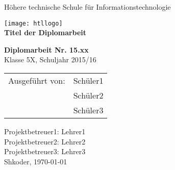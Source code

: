 
\newcommand{\trtitle}{Titel der Diplomarbeit}
\newcommand{\trort}{Shkoder}
\newcommand{\trbetreuer}{Titel Betreuer}
\newcommand{\trdate}{\today}
\newcommand{\trnumber}{15.xx}
\newcommand{\trclass}{5X}
\newcommand{\trschuelereins}{Sch\"uler1}
\newcommand{\trschuelerzwei}{Sch\"uler2}
\newcommand{\trschuelerdrei}{Sch\"uler3}
\newcommand{\trsauftraggeber}{Herr Max Mustermann oder Firma}
\newcommand{\trbetreuereins}{Lehrer1}
\newcommand{\trbetreuerzwei}{Lehrer2}
\newcommand{\trbetreuerdrei}{Lehrer3}

\thispagestyle{empty}

\begin{center}
  \Large H\"ohere technische Schule f\"ur Informationstechnologie
\end{center}

\begin{center}
  \texttt{[image: htllogo]} \\
  \textbf{\LARGE \trtitle}
\end{center}
\vspace{1cm}

\begin{flushleft}
\textbf{\LARGE Diplomarbeit Nr. \trnumber} \\
\LARGE Klasse \trclass{}, Schuljahr 2015/16

\begin{table}[htbp]
\Large
\begin{tabular}{cl}
   Ausgef\"uhrt von: & \trschuelereins \\ 
   & \trschuelerzwei \\ 
   & \trschuelerdrei \\ 
 \end{tabular}
\end{table}
\end{flushleft}


\large Projektbetreuer1: \trbetreuereins \\
\large Projektbetreuer2: \trbetreuerzwei \\
\large Projektbetreuer3: \trbetreuerdrei \\
\newline
\large \trort{}, \today

\vfill